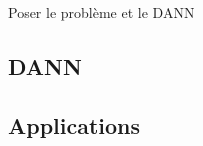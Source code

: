 \TODO Poser le problème et le DANN

\subsection{DANN} %
\label{sub:dann}

\subsection{Applications} %
\label{sub:applications}

